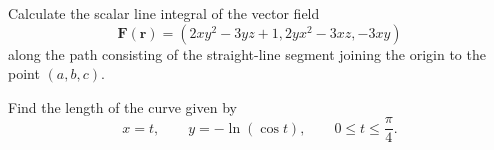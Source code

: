 \documentclass[answers]{exam}
\begin{document}
\begin{questions}
\question%
Calculate the scalar line integral of the vector field \[
	\mathbf F(\mathbf r)=(2xy^2-3yz+1,2yx^2-3xz,-3xy)
\] along the path consisting of the straight-line segment joining the origin to the point $(a, b, c)$.



\question%
Find the length of the curve given by \[
	x=t, \qquad y=-\ln(\cos t), \qquad 0 \leq t \leq\frac\pi4.
\]

\end{questions}
\end{document}
